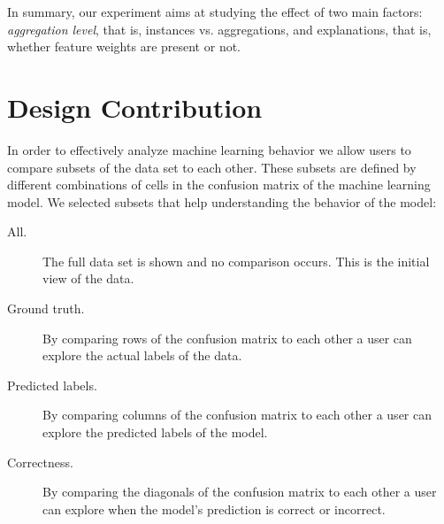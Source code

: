 In summary, our experiment aims at studying the effect of two main factors: \textit{aggregation level}, that is, instances vs. aggregations, and explanations, that is, whether feature weights are present or not.





\section{Design Contribution}
\label{sec:design}
In order to effectively analyze machine learning behavior we allow users to compare subsets of the data set to each other.
These subsets are defined by different combinations of cells in the confusion matrix of the machine learning model.
We selected subsets that help understanding the behavior of the model:

\begin{description}
\item[All.] The full data set is shown and no comparison occurs. This is the initial view of the data.
\item[Ground truth.] By comparing rows of the confusion matrix to each other a user can explore the actual labels of the data.
\item[Predicted labels.] By comparing columns of the confusion matrix to each other a user can explore the predicted labels of the model.
\item[Correctness.] By comparing the diagonals of the confusion matrix to each other a user can explore when the model's prediction is correct or incorrect.
\end{description}


